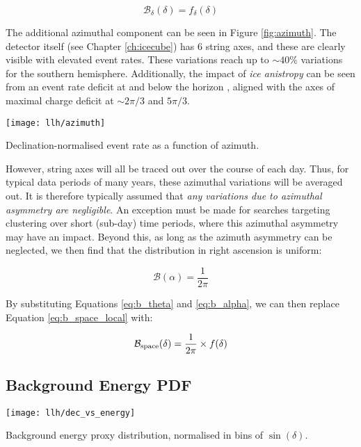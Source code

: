 \begin{equation}
	\mathcal{B}_{\delta}(\delta) = f_{\delta}(\delta)
	\label{eq:b_theta}
\end{equation}

The additional azimuthal component can be seen in Figure \ref{fig:azimuth}. The detector itself (see Chapter \ref{ch:icecube}) has 6 string axes, and these are clearly visible with elevated event rates. These variations reach up to $\sim40\%$ variations for the southern hemisphere. Additionally, the impact of \emph{ice anistropy} can be seen from an event rate deficit at and below the horizon , aligned with the axes of maximal charge deficit at $\sim2\pi / 3$ and $5\pi / 3$. 

\begin{marginfigure}
	\centering \texttt{[image: llh/azimuth]}
	\caption{Declination-normalised event rate as a function of azimuth.}
	\label{fig:azimuth}
\end{marginfigure}

However, string axes will all be traced out over the course of each day. Thus, for typical data periods of many years, these azimuthal variations will be averaged out. It is therefore typically assumed that \emph{any variations due to azimuthal asymmetry are negligible}.  An exception must be made for searches targeting clustering over short (sub-day) time periods, where this azimuthal asymmetry may have an impact. Beyond this, as long as the azimuth asymmetry can be neglected, we then find that the distribution in right ascension is uniform:

\begin{equation}
	\mathcal{B} (\alpha) = \frac{1}{2\pi}
	\label{eq:b_alpha}
\end{equation}

By substituting Equations \ref{eq:b_theta} and \ref{eq:b_alpha}, we can then replace Equation \ref{eq:b_space_local} with:

\begin{equation}
	\mathcal{B}_{\textup{space}} (\delta) = \frac{1}{2\pi} \times f(\delta)
	\label{eq:b_space}
\end{equation}

\subsection*{Background Energy PDF}

\begin{marginfigure}
	\centering \texttt{[image: llh/dec\_vs\_energy]}
	\caption{Background energy proxy distribution, normalised in bins of $\sin(\delta)$.}
	\label{fig:dec_vs_energy}
\end{marginfigure}

